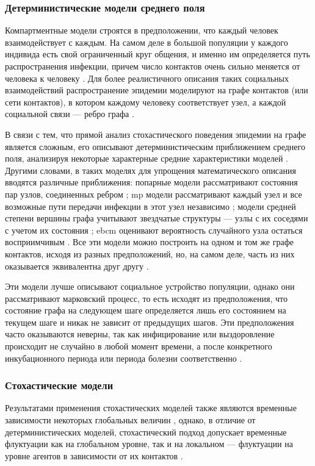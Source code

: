 \documentclass[a4paper,12pt]{article} %
\begin{document}
\subsubsection{Детерминистические модели среднего поля}
Компартментные модели строятся в предположении, что каждый человек взаимодействует с каждым. На самом деле в большой популяции у каждого индивида есть свой ограниченный круг общения, и именно им определяется путь распространения инфекции, причем число контактов очень сильно меняется от человека к человеку \cite{pastor2001epidemic}. Для более реалистичного описания таких социальных взаимодействий распространение эпидемии моделируют на графе контактов (или сети контактов), в котором каждому человеку соответствует узел, а каждой социальной связи --- ребро графа \cite{sherborne2018mean}.

В связи с тем, что прямой анализ стохастического поведения эпидемии на графе является сложным, его описывают детерминистическим приближением среднего поля, анализируя некоторые характерные средние характеристики моделей \cite{sherborne2018mean}. Другими словами, в таких моделях для упрощения математического описания вводятся различные приближения: попарные модели рассматривают состояния пар узлов, соединенных ребром \cite{keeling1999effects, house2011insights}; \gls{mp} модели рассматривают каждый узел и все возможные пути передачи инфекции в этот узел независимо \cite{karrer2010message}; модели средней степени вершины графа учитывают звездчатые структуры --- узлы с их соседями с учетом их состояния \cite{lindquist2011effective}; \gls{ebcm} оценивают вероятность случайного узла остаться восприимчивым \cite{miller2012edge}. Все эти модели можно построить на одном и том же графе контактов, исходя из разных предположений, но, на самом деле, часть из них оказывается эквивалентна друг другу \cite{sherborne2018mean}.

Эти модели лучше описывают социальное устройство популяции, однако они рассматривают марковский процесс, то есть исходят из предположения, что состояние графа на следующем шаге определяется лишь его состоянием на текущем шаге и никак не зависит от предыдущих шагов. Эти предположения часто оказываются неверны, так как инфицирование или выздоровление происходит не случайно в любой момент времени, а после конкретного инкубационного периода или периода болезни соответственно \cite{keeling2005networks,volz2008sir,house2011insights}. 

\subsubsection{Стохастические модели}
Результатами применения стохастических моделей также являются временные зависимости некоторых глобальных величин \cite{aiello2003new,haas1999temporal}, однако, в отличие от детерминистических моделей, стохастический подход допускает временные флуктуации как на глобальном уровне, так и на локальном --- флуктуации на уровне агентов в зависимости от их контактов \cite{nakamura2017efficient}.
\end{document}

